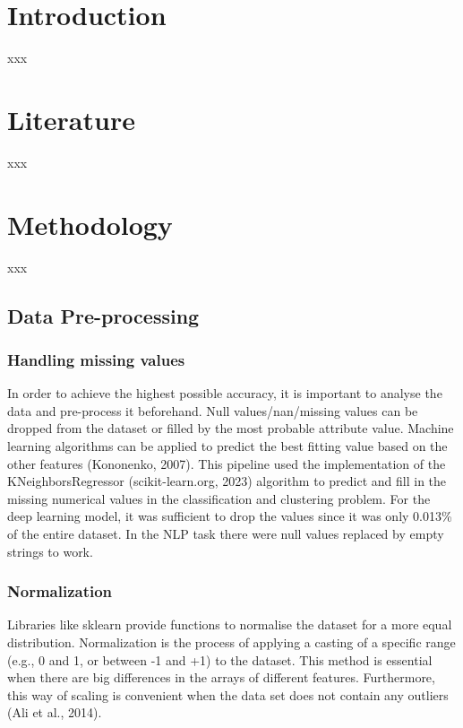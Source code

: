 \documentclass{article}
\begin{document}
\begin{multicols}{2}

\section{Introduction}

xxx

\section{Literature}

xxx

\section{Methodology}

xxx

\subsection{Data Pre-processing}

\subsubsection{Handling missing values}

In order to achieve the highest possible accuracy, it is important to analyse the data and pre-process it beforehand. Null values/nan/missing values can be dropped from the dataset or filled by the most probable attribute value. Machine learning algorithms can be applied to predict the best fitting value based on the other features (Kononenko, 2007).
This pipeline used the implementation of the KNeighborsRegressor (scikit-learn.org, 2023) algorithm to predict and fill in the missing numerical values in the classification and clustering problem. For the deep learning model, it was sufficient to drop the values since it was only 0.013\% of the entire dataset. In the NLP task there were null values replaced by empty strings to work.

\subsubsection{Normalization}

Libraries like sklearn provide functions to normalise the dataset for a more equal distribution. Normalization is the process of applying a casting of a specific range (e.g., 0 and 1, or between -1 and +1) to the dataset. This method is essential when there are big differences in the arrays of different features. Furthermore, this way of scaling is convenient when the data set does not contain any outliers (Ali et al., 2014).


\end{multicols}
\end{document}
